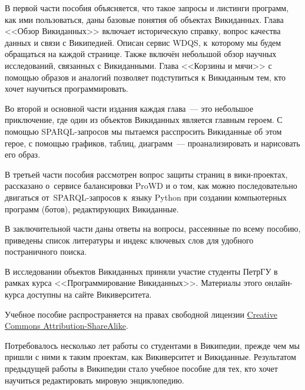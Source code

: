 В первой части пособия объясняется, 
что такое запросы и листинги программ, как ими пользоваться, даны базовые понятия об объектах Викиданных. 
Глава <<Обзор Викиданных>> включает историческую справку, 
вопрос качества данных и связи с Википедией. 
Описан сервис WDQS, к~которому мы будем обращаться на каждой странице. 
Также включён небольшой обзор научных исследований, связанных с Викиданными. 
Глава <<Корзины и мячи>> с помощью образов и аналогий позволяет подступиться к Викиданным тем, 
кто хочет научиться программировать. 


Во второй и основной части издания 
каждая глава~--- это небольшое приключение, 
где один из объектов Викиданных является главным героем. 
С помощью SPARQL-запросов мы пытаемся расспросить Викиданные об этом герое, 
с помощью графиков, таблиц, диаграмм~--- проанализировать и нарисовать его образ. 



\newpage
В третьей части пособия %
рассмотрен вопрос защиты страниц в вики-проектах, 
рассказано о~сервисе балансировки ProWD и о том, 
как можно последовательно двигаться от~SPARQL-запросов 
к~языку Python при создании компьютерных программ (ботов), редактирующих Викиданные. 


В заключительной части 
даны ответы на вопросы, рассеянные по всему пособию, приведены список литературы 
и индекс ключевых слов для удобного постраничного поиска.


В исследовании объектов Викиданных приняли участие студенты ПетрГУ в рамках курса <<Программирование Викиданных>>. 
Материалы этого онлайн-курса доступны на сайте Викиверситета. 

Учебное пособие распространяется на правах свободной лицензии 
\href{https://creativecommons.org/licenses/by-sa/4.0/deed.ru}{Creative Commons Attribution-ShareAlike}.

Потребовалось несколько лет работы со студентами в Википедии, прежде чем мы пришли с ними к таким проектам, 
как Викиверситет и Викиданные. 
Результатом предыдущей работы в Википедии стало учебное пособие для тех, 
кто хочет научиться редактировать мировую энциклопедию.

